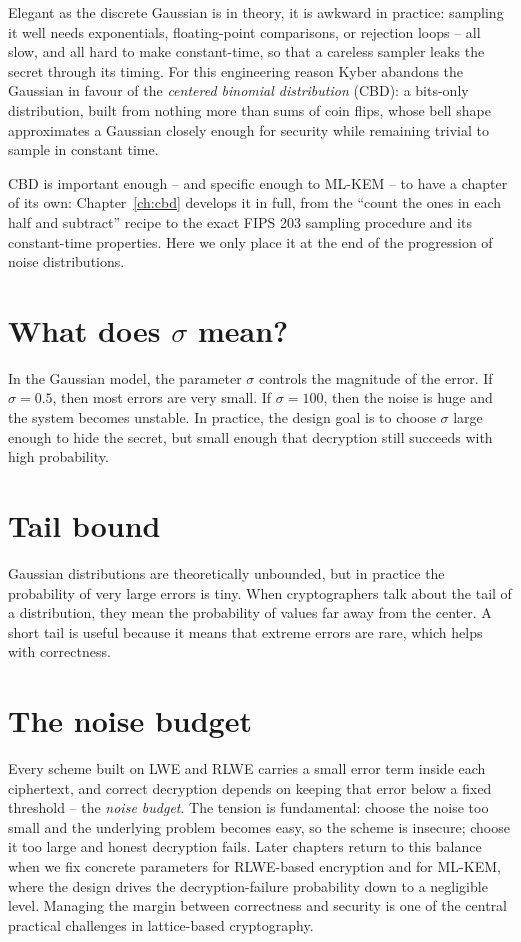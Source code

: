 Elegant as the discrete Gaussian is in theory, it is awkward in practice: sampling it well needs exponentials, floating-point comparisons, or rejection loops -- all slow, and all hard to make constant-time, so that a careless sampler leaks the secret through its timing. For this engineering reason Kyber abandons the Gaussian in favour of the \emph{centered binomial distribution} (CBD): a bits-only distribution, built from nothing more than sums of coin flips, whose bell shape approximates a Gaussian closely enough for security while remaining trivial to sample in constant time.

CBD is important enough -- and specific enough to ML-KEM -- to have a chapter of its own: Chapter~\ref{ch:cbd} develops it in full, from the ``count the ones in each half and subtract'' recipe to the exact FIPS 203 sampling procedure and its constant-time properties. Here we only place it at the end of the progression of noise distributions.

\section{What does $\sigma$ mean?}

In the Gaussian model, the parameter $\sigma$ controls the magnitude of the error. If $\sigma=0.5$, then most errors are very small. If $\sigma=100$, then the noise is huge and the system becomes unstable. In practice, the design goal is to choose $\sigma$ large enough to hide the secret, but small enough that decryption still succeeds with high probability.

\section{Tail bound}

Gaussian distributions are theoretically unbounded, but in practice the probability of very large errors is tiny. When cryptographers talk about the tail of a distribution, they mean the probability of values far away from the center. A short tail is useful because it means that extreme errors are rare, which helps with correctness.

\section{The noise budget}

Every scheme built on LWE and RLWE carries a small error term inside each ciphertext, and correct decryption depends on keeping that error below a fixed threshold -- the \emph{noise budget}. The tension is fundamental: choose the noise too small and the underlying problem becomes easy, so the scheme is insecure; choose it too large and honest decryption fails. Later chapters return to this balance when we fix concrete parameters for RLWE-based encryption and for ML-KEM, where the design drives the decryption-failure probability down to a negligible level. Managing the margin between correctness and security is one of the central practical challenges in lattice-based cryptography.

